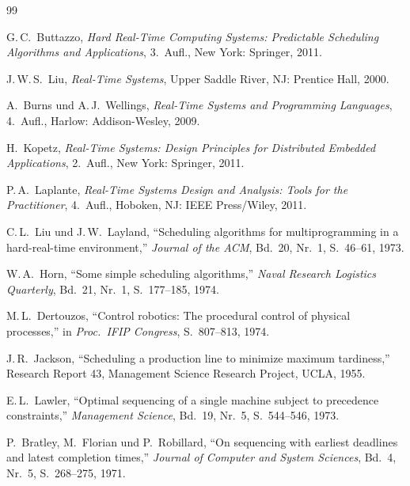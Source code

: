 ﻿\documentclass[a4paper,12pt]{report}
\theoremstyle{definition}
\begin{document}
\begin{thebibliography}{99}


G.\,C.\ Buttazzo,
\textit{Hard Real-Time Computing Systems: Predictable Scheduling Algorithms
and Applications},
3.~Aufl., New York: Springer, 2011.

J.\,W.\,S.\ Liu,
\textit{Real-Time Systems},
Upper Saddle River, NJ: Prentice Hall, 2000.

A.\ Burns und A.\,J.\ Wellings,
\textit{Real-Time Systems and Programming Languages},
4.~Aufl., Harlow: Addison-Wesley, 2009.

H.\ Kopetz,
\textit{Real-Time Systems: Design Principles for Distributed Embedded Applications},
2.~Aufl., New York: Springer, 2011.

P.\,A.\ Laplante,
\textit{Real-Time Systems Design and Analysis: Tools for the Practitioner},
4.~Aufl., Hoboken, NJ: IEEE Press/Wiley, 2011.


C.\,L.\ Liu und J.\,W.\ Layland,
``Scheduling algorithms for multiprogramming in a hard-real-time environment,''
\textit{Journal of the ACM}, Bd.~20, Nr.~1, S.~46--61, 1973.

W.\,A.\ Horn,
``Some simple scheduling algorithms,''
\textit{Naval Research Logistics Quarterly}, Bd.~21, Nr.~1, S.~177--185, 1974.

M.\,L.\ Dertouzos,
``Control robotics: The procedural control of physical processes,''
in \textit{Proc.\ IFIP Congress}, S.~807--813, 1974.

J.\,R.\ Jackson,
``Scheduling a production line to minimize maximum tardiness,''
Research Report 43, Management Science Research Project, UCLA, 1955.

E.\,L.\ Lawler,
``Optimal sequencing of a single machine subject to precedence constraints,''
\textit{Management Science}, Bd.~19, Nr.~5, S.~544--546, 1973.

P.\ Bratley, M.\ Florian und P.\ Robillard,
``On sequencing with earliest deadlines and latest completion times,''
\textit{Journal of Computer and System Sciences}, Bd.~4, Nr.~5, S.~268--275, 1971.


\end{thebibliography}
\end{document}
